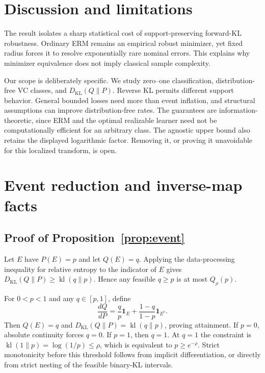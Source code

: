 \documentclass{article}
\theoremstyle{remark}
\newcommand{\KL}{D_{\mathrm{KL}}}
\newcommand{\kl}{\operatorname{kl}}
\begin{document}
\section{Discussion and limitations}

The result isolates a sharp statistical cost of support-preserving forward-KL
robustness.  Ordinary ERM remains an empirical robust minimizer, yet fixed
radius forces it to resolve exponentially rare nominal errors.  This explains
why minimizer equivalence does not imply classical sample complexity.

Our scope is deliberately specific.  We study zero--one classification,
distribution-free VC classes, and $D_{\mathrm{KL}}(Q\|P)$.  Reverse KL permits
different support behavior.  General bounded losses need more than event
inflation, and structural assumptions can improve distribution-free rates.
The guarantees are information-theoretic, since ERM and the optimal realizable
learner need not be computationally efficient for an arbitrary class.  The
agnostic upper bound also retains the displayed logarithmic factor.  Removing
it, or proving it unavoidable for this localized transform, is open.




\appendix

\section{Event reduction and inverse-map facts}
\label{app:event}

\subsection{Proof of Proposition~\ref{prop:event}}

Let $E$ have $P(E)=p$ and let $Q(E)=q$.  Applying the data-processing
inequality for relative entropy to the indicator of $E$ gives
$\KL(Q\|P)\ge\kl(q\|p)$.  Hence any feasible $q\ge p$ is at most
$Q_\rho(p)$.

For $0<p<1$ and any $q\in[p,1]$, define
\[
 \frac{dQ}{dP}=\frac qp\mathbf 1_E+
 \frac{1-q}{1-p}\mathbf 1_{E^c}.
\]
Then $Q(E)=q$ and $\KL(Q\|P)=\kl(q\|p)$, proving attainment.  If $p=0$,
absolute continuity forces $q=0$.  If $p=1$, then $q=1$.  At $q=1$ the
constraint is $\kl(1\|p)=\log(1/p)\le\rho$, which is equivalent to
$p\ge e^{-\rho}$.  Strict monotonicity before this threshold follows from
implicit differentiation, or directly from strict nesting of the feasible
binary-KL intervals.
\end{document}
